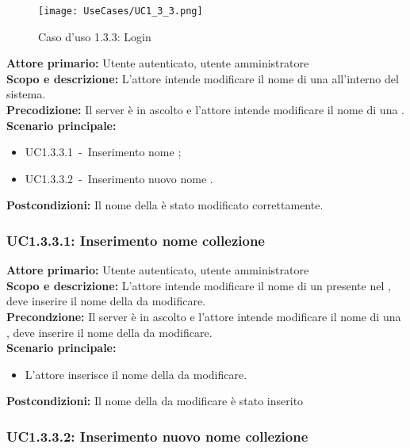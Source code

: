 \documentclass{scalatekids-article}
\begin{document}
\begin{figure}[H]
  \begin{center}
    \texttt{[image: UseCases/UC1\_3\_3.png]}
    \caption*{Caso d'uso 1.3.3: Login}
  \end{center}
\end{figure}
\textbf{Attore primario:} Utente autenticato, utente amministratore\\
\textbf{Scopo e descrizione:} L’attore intende modificare il nome di una  all'interno del sistema.\\
\textbf{Precodizione:} Il server è in ascolto e l’attore intende modificare il nome di una .\\
\textbf{Scenario principale:}
\begin{itemize}
\item UC1.3.3.1\ -\ Inserimento nome ;
\item UC1.3.3.2\ -\ Inserimento nuovo nome .
\end{itemize}
\textbf{Postcondizioni:} Il nome della  è stato modificato correttamente.

\subsubsection{UC1.3.3.1: Inserimento nome collezione}

\textbf{Attore primario:} Utente autenticato, utente amministratore\\
\textbf{Scopo e descrizione:} L'attore intende modificare il nome di un  presente nel , deve inserire il nome della  da modificare.\\
\textbf{Precondzione:} Il server è in ascolto e l'attore intende modificare il nome di una , deve inserire il nome della  da modificare.\\
\textbf{Scenario principale:}
\begin{itemize}
\item L'attore inserisce il nome della  da modificare.
\end{itemize}
\textbf{Postcondizioni:} Il nome della  da modificare è stato inserito

\subsubsection{UC1.3.3.2: Inserimento nuovo nome collezione}
\end{document}
